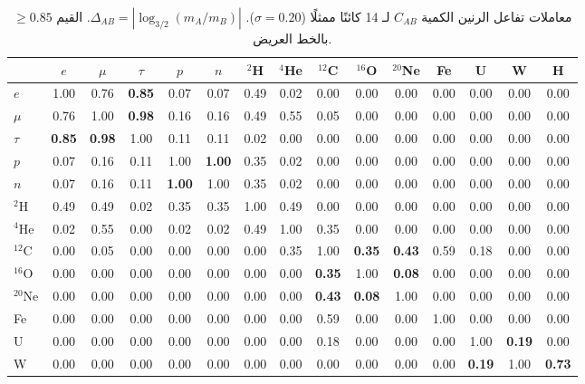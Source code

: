 \documentclass[11pt,a4paper]{article}
\begin{document}
	\begin{table}[H]
		\centering
		\caption{معاملات تفاعل الرنين الكمية \(C_{AB}\) لـ 14 كائنًا ممثلًا (\(\sigma = 0.20\)). \(\Delta_{AB} = |\log_{3/2}(m_A/m_B)|\). القيم \(\ge 0.85\) بالخط العريض.}
		\label{tab:CAB}
		\scriptsize
		\begin{tabular}{l c c c c c c c c c c c c c c}
			\toprule
			& \(e\) & \(\mu\) & \(\tau\) & \(p\) & \(n\) & \(^2\)H & \(^4\)He & \(^{12}\)C & \(^{16}\)O & \(^{20}\)Ne & Fe & U & W & H \\
			\midrule
			\(e\) & 1.00 & 0.76 & \textbf{0.85} & 0.07 & 0.07 & 0.49 & 0.02 & 0.00 & 0.00 & 0.00 & 0.00 & 0.00 & 0.00 & 0.00 \\
			\(\mu\) & 0.76 & 1.00 & \textbf{0.98} & 0.16 & 0.16 & 0.49 & 0.55 & 0.05 & 0.00 & 0.00 & 0.00 & 0.00 & 0.00 & 0.00 \\
			\(\tau\) & \textbf{0.85} & \textbf{0.98} & 1.00 & 0.11 & 0.11 & 0.02 & 0.00 & 0.00 & 0.00 & 0.00 & 0.00 & 0.00 & 0.00 & 0.00 \\
			\(p\) & 0.07 & 0.16 & 0.11 & 1.00 & \textbf{1.00} & 0.35 & 0.02 & 0.00 & 0.00 & 0.00 & 0.00 & 0.00 & 0.00 & 0.00 \\
			\(n\) & 0.07 & 0.16 & 0.11 & \textbf{1.00} & 1.00 & 0.35 & 0.02 & 0.00 & 0.00 & 0.00 & 0.00 & 0.00 & 0.00 & 0.00 \\
			\(^2\)H & 0.49 & 0.49 & 0.02 & 0.35 & 0.35 & 1.00 & 0.49 & 0.00 & 0.00 & 0.00 & 0.00 & 0.00 & 0.00 & 0.00 \\
			\(^4\)He & 0.02 & 0.55 & 0.00 & 0.02 & 0.02 & 0.49 & 1.00 & 0.35 & 0.00 & 0.00 & 0.00 & 0.00 & 0.00 & 0.00 \\
			\(^{12}\)C & 0.00 & 0.05 & 0.00 & 0.00 & 0.00 & 0.00 & 0.35 & 1.00 & \textbf{0.35} & \textbf{0.43} & 0.59 & 0.18 & 0.00 & 0.00 \\
			\(^{16}\)O & 0.00 & 0.00 & 0.00 & 0.00 & 0.00 & 0.00 & 0.00 & \textbf{0.35} & 1.00 & \textbf{0.08} & 0.00 & 0.00 & 0.00 & 0.00 \\
			\(^{20}\)Ne & 0.00 & 0.00 & 0.00 & 0.00 & 0.00 & 0.00 & 0.00 & \textbf{0.43} & \textbf{0.08} & 1.00 & 0.00 & 0.00 & 0.00 & 0.00 \\
			Fe & 0.00 & 0.00 & 0.00 & 0.00 & 0.00 & 0.00 & 0.00 & 0.59 & 0.00 & 0.00 & 1.00 & 0.00 & 0.00 & 0.00 \\
			U & 0.00 & 0.00 & 0.00 & 0.00 & 0.00 & 0.00 & 0.00 & 0.18 & 0.00 & 0.00 & 0.00 & 1.00 & \textbf{0.19} & 0.00 \\
			W & 0.00 & 0.00 & 0.00 & 0.00 & 0.00 & 0.00 & 0.00 & 0.00 & 0.00 & 0.00 & 0.00 & \textbf{0.19} & 1.00 & \textbf{0.73} \\

\end{tabular}
\end{table}
\end{document}

